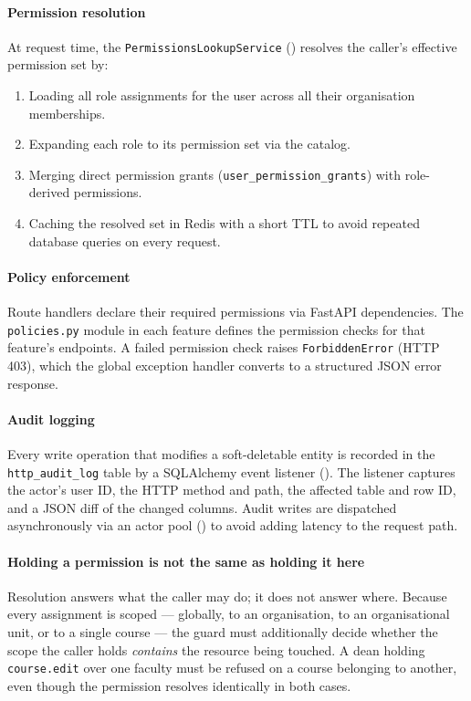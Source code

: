 \paragraph{Permission resolution}
At request time, the \texttt{PermissionsLookupService} () resolves the caller's effective permission set by:
\begin{enumerate}
    \item Loading all role assignments for the user across all their organisation memberships.
    \item Expanding each role to its permission set via the catalog.
    \item Merging direct permission grants (\texttt{user\_permission\_grants}) with role-derived permissions.
    \item Caching the resolved set in Redis with a short TTL to avoid repeated database queries on every request.
\end{enumerate}

\paragraph{Policy enforcement}
Route handlers declare their required permissions via FastAPI dependencies. The \texttt{policies.py} module in each feature defines the permission checks for that feature's endpoints. A failed permission check raises \texttt{ForbiddenError} (HTTP 403), which the global exception handler converts to a structured JSON error response.

\paragraph{Audit logging}
Every write operation that modifies a soft-deletable entity is recorded in the \texttt{http\_audit\_log} table by a SQLAlchemy event listener (). The listener captures the actor's user ID, the HTTP method and path, the affected table and row ID, and a JSON diff of the changed columns. Audit writes are dispatched asynchronously via an actor pool () to avoid adding latency to the request path.

\paragraph{Holding a permission is not the same as holding it here}
Resolution answers what the caller may do; it does not answer where. Because every assignment is scoped --- globally, to an organisation, to an organisational unit, or to a single course --- the guard must additionally decide whether the scope the caller holds \emph{contains} the resource being touched. A dean holding \texttt{course.edit} over one faculty must be refused on a course belonging to another, even though the permission resolves identically in both cases.

